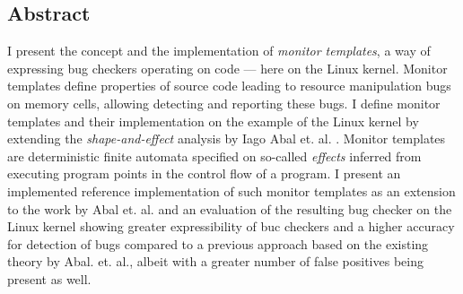 \subsection*{Abstract}

I present the concept and the implementation of \emph{monitor templates}, a way of expressing bug checkers operating on code --- here on the Linux kernel. Monitor templates define properties of source code leading to resource manipulation bugs on memory cells, allowing detecting and reporting these bugs. I define monitor templates and their implementation on the example of the Linux kernel by extending the \textit{shape-and-effect} analysis by Iago Abal et. al. \cite{Abal2017EffectiveBF}. Monitor templates are deterministic finite automata specified on so-called \textit{effects} inferred from executing program points in the control flow of a program. I present an implemented reference implementation of such monitor templates as an extension to the work by Abal et. al. and an evaluation of the resulting bug checker on the Linux kernel showing greater expressibility of buc checkers and a higher accuracy for detection of bugs compared to a previous approach based on the existing theory by Abal. et. al.\cite{research-project}, albeit with a greater number of false positives being present as well.  
